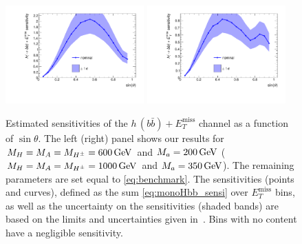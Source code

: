 \documentclass[a4paper, 11pt,notoc]{article}
\newcommand{\MET}{\ensuremath{E_T^\mathrm{miss}}\xspace}
\newcommand{\met}{\MET}
\newcommand{\mA}{\ensuremath{M_{A}}\xspace}
\newcommand{\ma}{\ensuremath{M_{a}}\xspace}
\newcommand{\mH}{\ensuremath{M_{H}}\xspace}
\newcommand{\mHc}{\ensuremath{M_{H^{\pm}}}\xspace}
\begin{document}
\begin{figure}[t!]
\centering
\includegraphics[width=0.475\textwidth]{monoHbb_sinp_scan_1_sensi_1D.pdf} \quad 
\includegraphics[width=0.475\textwidth]{monoHbb_sinp_scan_2_sensi_1D.pdf}
\vspace{4mm}
\caption{Estimated sensitivities of  the $h \, (b \bar b)+\MET$ channel as a function of $\sin \theta$. The left (right) panel shows our results for $\mH = \mA = \mHc = 600 \, {\rm GeV}$ and $\ma = 200 \, {\rm GeV}$ ($\mH = \mA = \mHc = 1000 \, {\rm GeV}$ and $\ma = 350 \, {\rm GeV}$).  The remaining parameters are set equal to \eqref{eq:benchmark}. The sensitivities (points and curves), defined as the sum \eqref{eq:monoHbb_sensi} over \met bins, as well as the uncertainty on the sensitivities (shaded bands)  are based on the limits and uncertainties given in~\cite{Aaboud:2017yqz}. Bins with no content have a negligible sensitivity. }
\label{fig:monoHbb_appendix1}
\end{figure}
\end{document}
